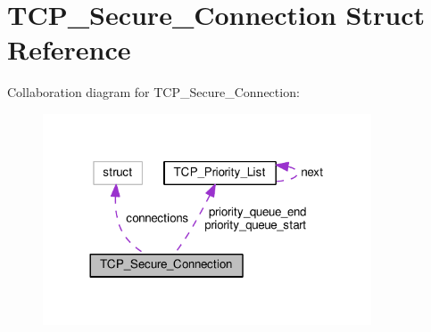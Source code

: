 \hypertarget{struct_t_c_p___secure___connection}{\section{T\+C\+P\+\_\+\+Secure\+\_\+\+Connection Struct Reference}
\label{struct_t_c_p___secure___connection}
}


Collaboration diagram for T\+C\+P\+\_\+\+Secure\+\_\+\+Connection\+:\nopagebreak
\begin{figure}[H]
\begin{center}
\leavevmode
\includegraphics[width=276pt]{struct_t_c_p___secure___connection__coll__graph}
\end{center}
\end{figure}
